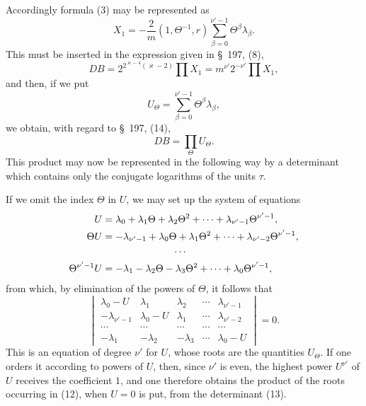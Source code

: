 \documentclass[11pt]{article}
\begin{document}
Accordingly formula (3) may be represented as
\begin{equation}
X_1=-\frac2m(1,\Theta^{-1},r)\sum_{\beta=0}^{\nu'-1}\Theta^\beta\lambda_\beta.
\tag{10}
\end{equation}
This must be inserted in the expression given in \S~197, (8),
\[
DB=2^{2^{\varkappa-4}(\varkappa-2)}\prod X_1=m^{\nu'}2^{-\nu'}\prod X_1,
\]
and then, if we put
\begin{equation}
U_\Theta=\sum_{\beta=0}^{\nu'-1}\Theta^\beta\lambda_\beta,
\tag{11}
\end{equation}
we obtain, with regard to \S~197, (14),
\begin{equation}
DB=\prod_\Theta U_\Theta.
\tag{12}
\end{equation}
This product may now be represented in the following way by a determinant which contains only the conjugate logarithms of the units $\tau$.

If we omit the index $\Theta$ in $U$, we may set up the system of equations
\[
\begin{aligned}
U&=\lambda_0+\lambda_1\Theta+\lambda_2\Theta^2+\cdots+\lambda_{\nu'-1}\Theta^{\nu'-1},\\
\Theta U&=-\lambda_{\nu'-1}+\lambda_0\Theta+\lambda_1\Theta^2+\cdots+\lambda_{\nu'-2}\Theta^{\nu'-1},\\
&\hspace{2.5cm}\cdots\\
\Theta^{\nu'-1}U&=-\lambda_1-\lambda_2\Theta-\lambda_3\Theta^2+\cdots+\lambda_0\Theta^{\nu'-1},
\end{aligned}
\]
from which, by elimination of the powers of $\Theta$, it follows that
\begin{equation}
\begin{vmatrix}
\lambda_0-U&\lambda_1&\lambda_2&\cdots&\lambda_{\nu'-1}\\
-\lambda_{\nu'-1}&\lambda_0-U&\lambda_1&\cdots&\lambda_{\nu'-2}\\
\cdots&\cdots&\cdots&\cdots&\cdots\\
-\lambda_1&-\lambda_2&-\lambda_3&\cdots&\lambda_0-U
\end{vmatrix}=0.
\tag{13}
\end{equation}
This is an equation of degree $\nu'$ for $U$, whose roots are the quantities $U_\Theta$. If one orders it according to powers of $U$, then, since $\nu'$ is even, the highest power $U^{\nu'}$ of $U$ receives the coefficient $1$, and one therefore obtains the product of the roots occurring in (12), when $U=0$ is put, from the determinant (13).
\end{document}
